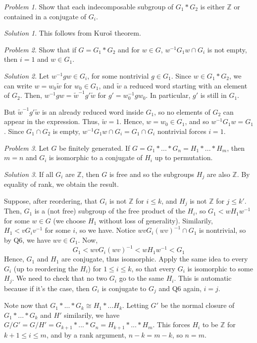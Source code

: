 \documentclass[11pt]{article}
\theoremstyle{definition}
\theoremstyle{example}
\theoremstyle{remark}
\theoremstyle{lemma}
\theoremstyle{proposition}
\theoremstyle{Problem}
\newtheorem{problem}{Problem}[section]
\theoremstyle{Solution}
\newtheorem{solution}{Solution}[section]
\theoremstyle{theorem}
\theoremstyle{corollary}
\begin{document}
\begin{problem}
Show that each indecomposable subgroup of $G_1*G_2$ is either $\mathbb{Z}$ or contained in a conjugate of $G_i$.
\end{problem}
\begin{solution}
This follows from Kuro\v{s} theorem.\\
\end{solution}

\begin{problem}
Show that if $G=G_1*G_2$ and for $w\in G$, $w^{-1}G_1w\cap G_i$ is not empty, then $i=1$ and $w\in G_1$.
\end{problem}
\begin{solution}
Let $w^{-1}gw\in G_i$, for some nontrivial $g\in G_1$. Since $w\in G_1*G_2$, we can write $w = w_0 \widetilde{w}$ for $w_0\in G_1$, and $\widetilde{w}$ a reduced word starting with an element of $G_2$. Then, $w^{-1}gw = \widetilde{w}^{-1} g' \widetilde{w}$ for $g' = w_0^{-1}gw_0$. In particular, $g'$ is still in $G_1$.

But $\widetilde{w}^{-1} g' \widetilde{w}$ is an already reduced word inside $G_1$, so no elements of $G_2$ can appear in the expression. Thus, $\widetilde{w} = 1$. Hence, $w = w_0\in G_1$, and so $w^{-1}G_1 w = G_1$. Since $G_1 \cap G_2$ is empty, $w^{-1}G_1w\cap G_i = G_1 \cap G_i$ nontrivial forces $i=1$.\\
\end{solution}

\begin{problem}
Let $G$ be finitely generated. If $G=G_1*...*G_n = H_1*...*H_m$, then $m=n$ and $G_i$ is isomorphic to a conjugate of $H_i$ up to permutation.
\end{problem}
\begin{solution}
If all $G_i$ are $\mathbb{Z}$, then $G$ is free and so the subgroups $H_j$ are also $\mathbb{Z}$. By equality of rank, we obtain the result.

Suppose, after reordering, that $G_i$ is not $\mathbb{Z}$ for $i\leq k$, and $H_j$ is not $\mathbb{Z}$ for $j\leq k'$. Then, $G_1$ is a (not free) subgroup of the free product of the $H_i$, so $G_1<wH_1w^{-1}$ for some $w\in G$ (we choose $H_1$ without loss of generality). Similarily, $H_1 < vG_iv^{-1}$ for some $i$, so we have. Notice $wvG_i(wv)^{-1}\cap G_1$ is nontrivial, so by Q6, we have $wv \in G_1$. Now,
$$G_1 < wvG_i(wv)^{-1} < wH_1w^{-1} < G_1$$
Hence, $G_1$ and $H_1$ are conjugate, thus isomorphic. Apply the same idea to every $G_i$ (up to reordering the $H_i$) for $1\leq i \leq k$, so that every $G_i$ is isomorphic to some $H_j$. We need to check that no two $G_i$ go to the same $H_i$. This is automatic because if it's the case, then $G_i$ is conjugate to $G_j$ and Q6 again, $i=j$.

Note now that $G_1*...*G_k \cong H_1*...H_k$. Letting $G'$ be the normal closure of $G_1*...*G_k$ and $H'$ similarily, we have $G/G'=G/H' = G_{k+1}*...*G_n = H_{k+1}*...*H_m$. This forces $H_i$ to be $\mathbb{Z}$ for $k+1\leq i \leq m$, and by a rank argument, $n-k = m-k$, so $n=m$.\\
\end{solution}
\end{document}
